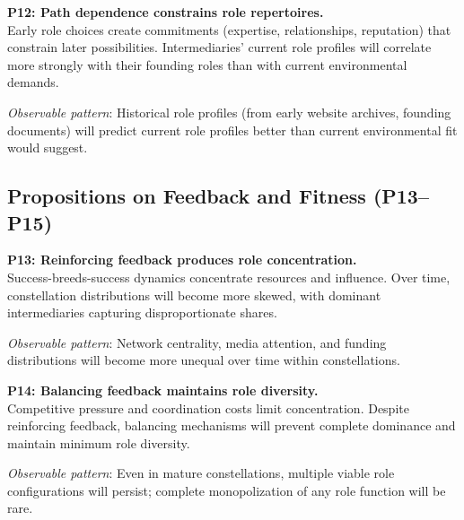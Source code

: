 \documentclass[../main.tex]{subfiles}
\begin{document}
\begin{propositionbox}
\textbf{P12: Path dependence constrains role repertoires.}\\[3pt]
Early role choices create commitments (expertise, relationships, reputation) that constrain later possibilities. Intermediaries' current role profiles will correlate more strongly with their founding roles than with current environmental demands.

\vspace{4pt}
\textit{Observable pattern}: Historical role profiles (from early website archives, founding documents) will predict current role profiles better than current environmental fit would suggest.
\end{propositionbox}

\subsection{Propositions on Feedback and Fitness (P13--P15)}

\begin{propositionbox}
\textbf{P13: Reinforcing feedback produces role concentration.}\\[3pt]
Success-breeds-success dynamics concentrate resources and influence. Over time, constellation distributions will become more skewed, with dominant intermediaries capturing disproportionate shares.

\vspace{4pt}
\textit{Observable pattern}: Network centrality, media attention, and funding distributions will become more unequal over time within constellations.
\end{propositionbox}

\begin{propositionbox}
\textbf{P14: Balancing feedback maintains role diversity.}\\[3pt]
Competitive pressure and coordination costs limit concentration. Despite reinforcing feedback, balancing mechanisms will prevent complete dominance and maintain minimum role diversity.

\vspace{4pt}
\textit{Observable pattern}: Even in mature constellations, multiple viable role configurations will persist; complete monopolization of any role function will be rare.
\end{propositionbox}
\end{document}
